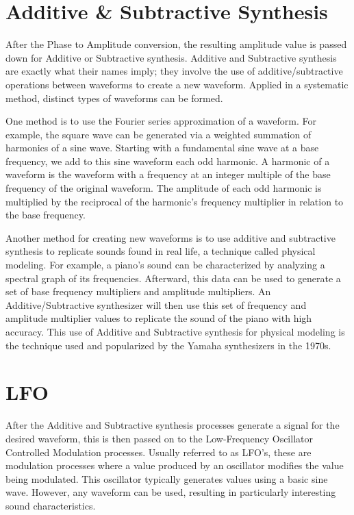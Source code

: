 \documentclass[a4paper,12pt]{report}
\begin{document}
\section{Additive \& Subtractive Synthesis}
\label{sec:addsubsynthesis}
After the Phase to Amplitude conversion, the resulting amplitude value is passed down for Additive or Subtractive synthesis. Additive and Subtractive synthesis are exactly what their names imply; they involve the use of additive/subtractive operations between waveforms to create a new waveform. Applied in a systematic method, distinct types of waveforms can be formed.

One method is to use the Fourier series approximation of a waveform. For example, the square wave can be generated via a weighted summation of harmonics of a sine wave. Starting with a fundamental sine wave at a base frequency, we add to this sine waveform each odd harmonic. A harmonic of a waveform is the waveform with a frequency at an integer multiple of the base frequency of the original waveform. The amplitude of each odd harmonic is multiplied by the reciprocal of the harmonic's frequency multiplier in relation to the base frequency.

Another method for creating new waveforms is to use additive and subtractive synthesis to replicate sounds found in real life, a technique called physical modeling. For example, a piano's sound can be characterized by analyzing a spectral graph of its frequencies. Afterward, this data can be used to generate a set of base frequency multipliers and amplitude multipliers. An Additive/Subtractive synthesizer will then use this set of frequency and amplitude multiplier values to replicate the sound of the piano with high accuracy. This use of Additive and Subtractive synthesis for physical modeling is the technique used and popularized by the Yamaha synthesizers in the 1970s.

\section{LFO}
\label{sec:lfo}
After the Additive and Subtractive synthesis processes generate a signal for the desired waveform, this is then passed on to the Low-Frequency Oscillator Controlled Modulation processes. Usually referred to as LFO's, these are modulation processes where a value produced by an oscillator modifies the value being modulated. This oscillator typically generates values using a basic sine wave. However, any waveform can be used, resulting in particularly interesting sound characteristics.
\end{document}
